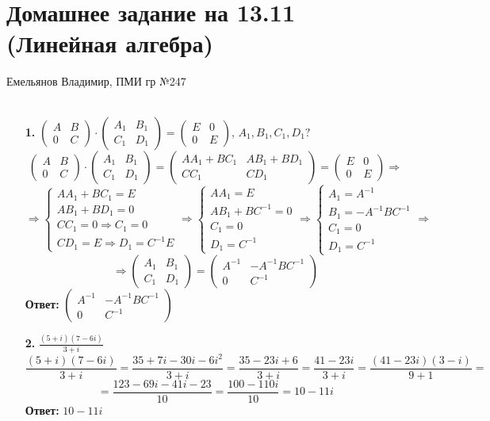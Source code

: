 \documentclass[a4paper]{article}
\newcommand{\mat}[1]{\begin{pmatrix} #1 \end{pmatrix}}
\renewcommand{\f}[2]{\frac{#1}{#2}}
\newcommand{\case}[1]{\begin{cases} #1 \end{cases}}
\renewcommand{\r}{\Rightarrow}
\begin{document}
\section*{Домашнее задание на 13.11 (Линейная алгебра)}
 {\large Емельянов Владимир, ПМИ гр №247}\\\\
\begin{enumerate}
    \item[\textbf{1.}]$\mat{A & B \\ 0 & C}\cdot \mat{A_1 & B_1 \\ C_1 & D_1} = \mat{E & 0 \\ 0 & E}$, $A_1, B_1, C_1, D_1?$
    $$\mat{A & B \\ 0 & C}\cdot \mat{A_1 & B_1 \\ C_1 & D_1} = \mat{AA_1 +BC_1 & AB_1+BD_1 \\ CC_1 & CD_1} = \mat{E & 0 \\ 0 & E} \r$$
    $$\r \case{
        AA_1 +BC_1 = E \\
        AB_1+BD_1 = 0 \\
        CC_1 =0 \r C_1 = 0\\
        CD_1 = E \r D_1 = C^{-1}E 
    }\r \case{
        AA_1 = E \\
        AB_1+BC^{-1} = 0 \\
        C_1 = 0\\
        D_1 = C^{-1}
    }\r \case{
        A_1 = A^{-1} \\
        B_1= -A^{-1}BC^{-1} \\
        C_1 = 0\\
        D_1 = C^{-1}
    } \r $$
    $$\r \mat{A_1 & B_1 \\ C_1 & D_1} = \mat{A^{-1}  & -A^{-1}BC^{-1} \\ 0 & C^{-1}}$$
    \textbf{Ответ: }$\mat{A^{-1}  & -A^{-1}BC^{-1} \\ 0 & C^{-1}}$\\

    \item[\textbf{2.}]$\f{(5+i)(7-6i)}{3+i}$
    $$\f{(5+i)(7-6i)}{3+i} = \f{35+7i-30i-6i^2}{3+i} = \f{35-23i+6}{3+i} = \f{41-23i}{3+i} = \f{(41-23i)(3-i)}{9+1} =$$
    $$= \f{123-69i-41i-23}{10} =  \f{100-110i}{10} = 10 - 11i$$
    \textbf{Ответ: }$10 -11i$\\


\end{enumerate}
\end{document}
